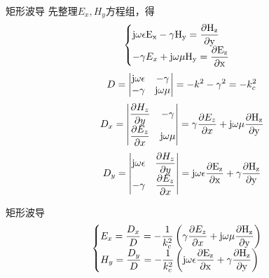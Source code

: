 \begin{frame}{矩形波导}
    先整理$E_x,H_y$方程组，得
    \begin{align*}
        \begin{cases}
            \rm{j}\omega\epsilon E_x-\gamma H_y=\dfrac{\partial H_z}{\partial y}\\
            -\gamma E_x+\rm{j}\omega\mu H_y=\dfrac{\partial E_z}{\partial x}\\
        \end{cases}
    \end{align*}
    \begin{align*}
        D=
        \begin{vmatrix}
            \rm{j}\omega\epsilon & -\gamma \\
            -\gamma & \rm{j}\omega\mu\\
        \end{vmatrix}
        =-k^2-\gamma^2=-k_c^2
    \end{align*}
    \begin{align*}
        D_x=
        \begin{vmatrix}
            \dfrac{\partial H_z}{\partial y} & -\gamma \\
            \dfrac{\partial E_z}{\partial x} & \rm{j}\omega\mu\\
        \end{vmatrix}
        =\gamma\frac{\partial E_z}{\partial x}+\rm{j}\omega\mu\frac{\partial H_z}{\partial y}
    \end{align*}
    \begin{align*}
        D_y=
        \begin{vmatrix}
            \rm{j}\omega\epsilon & \dfrac{\partial H_z}{\partial y} \\
            -\gamma & \dfrac{\partial E_z}{\partial x}\\
        \end{vmatrix}
        =\rm{j}\omega\epsilon\frac{\partial E_z}{\partial x}+\gamma \frac{\partial H_z}{\partial y}
    \end{align*}
\end{frame}

\begin{frame}{矩形波导}
    \begin{align}
        \begin{cases}
            E_x=\dfrac{D_x}{D}=-\dfrac{1}{k_c^2}\left(\gamma\dfrac{\partial E_z}{\partial x}+\rm{j}\omega\mu\dfrac{\partial H_z}{\partial y}\right)\\
            H_y=\dfrac{D_y}{D}=-\dfrac{1}{k_c^2}\left(\rm{j}\omega\epsilon\dfrac{\partial E_z}{\partial x}+\gamma\dfrac{\partial H_z}{\partial y}\right)
        \end{cases}
        \label{eqn6-13}
    \end{align}
\end{frame}

